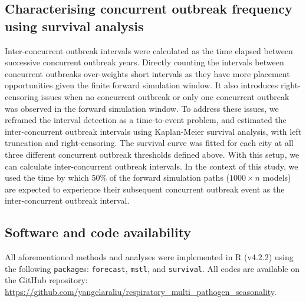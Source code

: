 \subsection{Characterising concurrent outbreak frequency using survival analysis}
Inter-concurrent outbreak intervals were calculated as the time elapsed between successive concurrent outbreak years.
Directly counting the intervals between concurrent outbreaks over-weights short intervals as they have more placement opportunities given the finite forward simulation window.
It also introduces right-censoring issues when no concurrent outbreak or only one concurrent outbreak was observed in the forward simulation window.
To address these issues, we reframed the interval detection as a time-to-event problem, and estimated the inter-concurrent outbreak intervals using Kaplan-Meier survival analysis, with left truncation and right-censoring.
The survival curve was fitted for each city at all three different concurrent outbreak thresholds defined above.
With this setup, we can calculate inter-concurrent outbreak intervals.
In the context of this study, we used the time by which 50\% of the forward simulation paths ($1000 \times n$ models) are expected to experience their subsequent concurrent outbreak event as the inter-concurrent outbreak interval. 

\subsection{Software and code availability}
All aforementioned methods and analyses were implemented in R (v4.2.2) using the following \texttt{package}s: \texttt{forecast}, \texttt{mstl}, and \texttt{survival}. All codes are available on the GitHub repository: \url{https://github.com/yangclaraliu/respiratory_multi_pathogen_seasonality}.
